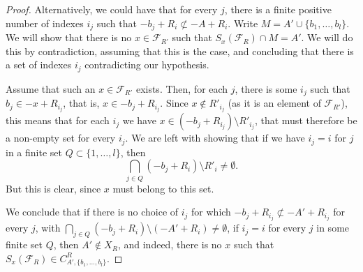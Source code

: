 \documentclass[a4paper,11pt,reqno]{amsart}
\theoremstyle{plain}
\theoremstyle{remark}
\newcommand{\fr}{\mathcal{F}_R}
\newcommand{\frp}{\mathcal{F}_{R'}}
\begin{document}
\begin{proof}
				Alternatively, we could have that for every $j$, there is a finite positive number of indexes $i_j$ such that $-b_j + R_i \not \subset -A + R_i$. Write  $M = A' \cup \{b_1, \dots, b_l\}$. We will show that there is no $x \in \frp$ such that $S_x(\fr) \cap M = A'$. We will do this by contradiction, assuming that this is the case, and concluding that there is a set of indexes $i_j$ contradicting our hypothesis. 
				
				Assume that such an $x \in \frp$ exists. Then, for each $j$, there is some $i_j$ such that $b_j \in -x+R_{i_j}$, that is, $x \in -b_j + R_{i_j}$. Since $x \not \in R'_{i_j}$ (as it is an element of $\frp$), this means that for each $i_j$ we have $x \in (-b_{j} + R_{i_j})\setminus  R'_{i_j}$, that must therefore be a non-empty set for every $i_j$. We are left with showing that if we have $i_j = i$ for $j$ in a finite set $Q\subset \{1,\dots,l\}$, then $$\bigcap_{j \in Q} (-b_j + R_i) \setminus R'_i \neq \emptyset.$$ But this is clear, since $x $ must belong to this set.
				
				We conclude that if there is no choice of $i_j$ for which $-b_j + R_{i_j} \not \subset -A' + R_{i_j}$ for every $j$, with $\bigcap_{j \in Q} (-b_j + R_i) \setminus (-A'+R_i) \neq \emptyset$, if $i_j = i$ for every $j$ in some finite set $Q$, then $A' \not \in X_R$, and indeed, there is no $x$ such that $S_x(\fr) \in C^R_{A',\{b_1,\dots,b_l\}}$. 
			\end{proof}
			
\end{document}
